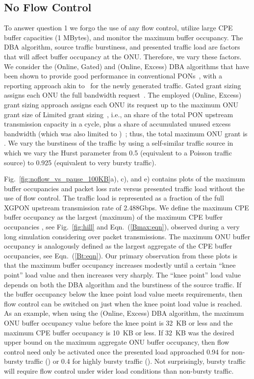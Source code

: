 \documentclass[pdftex,journal]{IEEEtran}
\begin{document}
\subsection{No Flow Control}
To answer question 1 we forgo the use of any flow control, utilize
large CPE buffer capacities (1 MBytes), and monitor the
maximum buffer occupancy. The DBA algorithm, source traffic
burstiness, and presented traffic load are factors that will affect
buffer occupancy at the ONU. Therefore, we vary these factors. We
consider the (Online, Gated) and (Online, Excess) DBA algorithms that
have been shown to provide good performance in conventional
PONs~\cite{MR0712}, with a reporting approach akin to~\cite{sku2010dyn}
for the newly generated traffic.
Gated grant sizing assigns each ONU the full bandwidth
request~\cite{KMP0202,ZM0709}.
The employed (Online, Excess) grant sizing
approach assigns each ONU its request up to
the maximum ONU grant size of Limited grant sizing~\cite{KMP0202,ZM0709},
i.e., an  share of the total PON upstream transmission capacity 
in a cycle,
plus a  share of accumulated unused excess bandwidth (which was
also limited to )~\cite{MerMcM13}; thus, the total maximum
ONU grant is .
We vary the
burstiness of the traffic by using a self-similar traffic source in
which we vary the Hurst parameter from 0.5 (equivalent to a Poisson
traffic source) to 0.925 (equivalent to very bursty traffic).

Fig.~\ref{fig:noflow_vs_pause_100KB}a), c), and e)
contains plots of the maximum buffer occupancies and packet loss rate
versus presented traffic load without the use of flow
control.
The traffic load is represented as a fraction of the full XGPON upstream
transmission rate of 2.488Gbps.
We define the maximum CPE buffer occupancy as the largest (maximum)
of the maximum CPE buffer occupancies ,
see Fig.~\ref{fig:hill} and Eqn.~(\ref{Bmax:eqn}), observed during a very long
simulation considering over  packet transmissions.
The maximum ONU buffer occupancy is analogously defined as the largest
aggregate of the CPE buffer occupancies, see Eqn.~(\ref{Bt:eqn}).
Our primary observation from these plots is that the maximum buffer
occupancy increases modestly until a certain ``knee point''
load value and
then increases very sharply. The ``knee point'' load value
depends on both the
DBA algorithm and the burstiness of the source traffic.
If the buffer occupancy below the knee point load value meets
requirements, then flow control can be switched on
just when the knee point load value is reached.
As an example, when using the (Online, Excess) DBA algorithm, the
maximum ONU buffer occupancy value before the knee point
is 32~KB or less and the maximum CPE buffer
occupancy is 10~KB or less.  If 32~KB was the desired upper bound
on the maximum aggregate ONU buffer occupancy, then flow control need
only be activated once the presented load approached 0.94 for
non-bursty traffic () or 0.4 for highly bursty traffic
(). Not surprisingly, bursty traffic will require flow control
under wider load conditions than non-bursty traffic.
\end{document}
